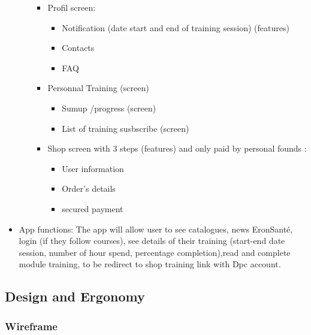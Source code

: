 \documentclass[
  12pt,
]{article}
\providecommand{\tightlist}{%
  \setlength{\itemsep}{0pt}\setlength{\parskip}{0pt}}
\begin{document}
\begin{itemize}
\begin{itemize}
    \begin{itemize}
    \tightlist
    \item
      Profil screen:

      \begin{itemize}
      \tightlist
      \item
        Notification (date start and end of training session) (features)
      \item
        Contacts
      \item
        FAQ
      \end{itemize}
    \item
      Personnal Training (screen)

      \begin{itemize}
      \tightlist
      \item
        Sumup /progress (screen)
      \item
        List of training susbscribe (screen)
      \end{itemize}
    \item
      Shop screen with 3 steps (features) and only paid by personal
      founds :

      \begin{itemize}
      \tightlist
      \item
        User information
      \item
        Order's details
      \item
        secured payment
      \end{itemize}
    \end{itemize}
  \end{itemize}
\item
  App functions: The app will allow user to see catalogues, news
  EronSanté, login (if they follow courses), see details of their
  training (start-end date session, number of hour spend, percentage
  completion),read and complete module training, to be redirect to shop
  training link with Dpc account.
\end{itemize}

\hypertarget{design-and-ergonomy}{%
\subsection{Design and Ergonomy}\label{design-and-ergonomy}}

\hypertarget{wireframe}{%
\subsubsection{Wireframe}\label{wireframe}}
\end{document}
